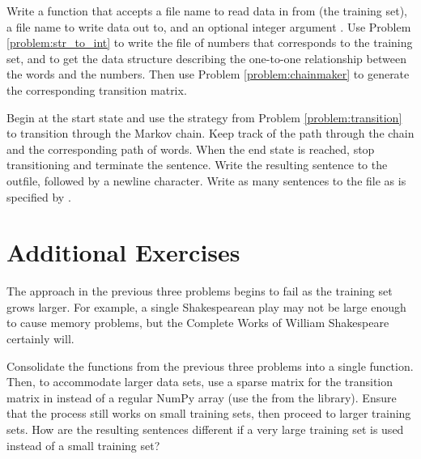 
\begin{problem}
Write a function that accepts a file name to read data in from (the training set), a file name to write data out to, and an optional integer argument .
Use Problem \ref{problem:str_to_int} to write the file of numbers that corresponds to the training set, and to get the data structure describing the one-to-one relationship between the words and the numbers.
Then use Problem \ref{problem:chainmaker} to generate the corresponding transition matrix.

Begin at the start state and use the strategy from Problem \ref{problem:transition} to transition through the Markov chain.
Keep track of the path through the chain and the corresponding path of words.
When the end state is reached, stop transitioning and terminate the sentence.
Write the resulting sentence to the outfile, followed by a newline character.
Write as many sentences to the file as is specified by .
\end{problem}

\section*{Additional Exercises}

\begin{problem}
The approach in the previous three problems begins to fail as the training set grows larger.
For example, a single Shakespearean play may not be large enough to cause memory problems, but the Complete Works of William Shakespeare certainly will.

Consolidate the functions from the previous three problems into a single function.
Then, to accommodate larger data sets, use a sparse matrix for the transition matrix in instead of a regular NumPy array (use the  from the  library).
Ensure that the process still works on small training sets, then proceed to larger training sets.
How are the resulting sentences different if a very large training set is used instead of a small training set?
\end{problem}
